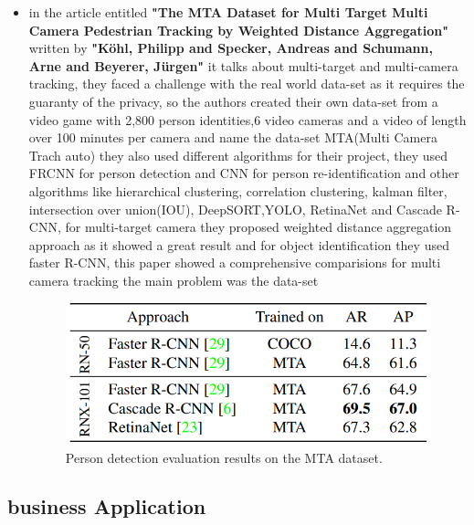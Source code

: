 \documentclass[12pt]{article}
\begin{document}
\begin{itemize}
    \item in the article entitled \textbf{"The MTA Dataset for Multi Target Multi Camera Pedestrian Tracking by Weighted Distance Aggregation"} \cite{9151039} written by \textbf{"Köhl, Philipp and Specker, Andreas and Schumann, Arne and Beyerer, Jürgen"} it talks about multi-target and multi-camera tracking, they faced a challenge with the real world data-set as it requires the guaranty of the privacy, so the authors created their own data-set from a video game with 2,800 person identities,6 video cameras and a video of length over 100 minutes per camera and name the data-set MTA(Multi Camera Trach auto) they also used different algorithms for their project, they used FRCNN for person detection and CNN for person re-identification and other algorithms like hierarchical clustering, correlation clustering, kalman filter, intersection over union(IOU), DeepSORT,YOLO, RetinaNet and Cascade R-CNN, for multi-target camera they proposed weighted distance aggregation approach as it showed a great result and for object identification they used faster R-CNN, this paper showed a comprehensive comparisions for multi camera tracking the main problem was the data-set
        \begin{figure}[H]
        \centering
        \includegraphics[width=0.75\linewidth]{figures/tdet.PNG}
        \caption{Person detection evaluation results on the MTA dataset.}
        \label{fig Person detection evaluation results on the MTA dataset.}
        \end{figure}

    \end{itemize}
    
\subsection{business Application}
\end{document}
